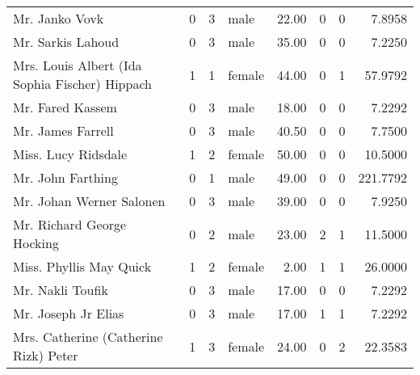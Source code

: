 \begin{tabular}{lrrlrrrr}
Mr. Janko Vovk                                     &         0 &       3 &    male &  22.00 &                        0 &                        0 &    7.8958 \\
Mr. Sarkis Lahoud                                  &         0 &       3 &    male &  35.00 &                        0 &                        0 &    7.2250 \\
Mrs. Louis Albert (Ida Sophia Fischer) Hippach     &         1 &       1 &  female &  44.00 &                        0 &                        1 &   57.9792 \\
Mr. Fared Kassem                                   &         0 &       3 &    male &  18.00 &                        0 &                        0 &    7.2292 \\
Mr. James Farrell                                  &         0 &       3 &    male &  40.50 &                        0 &                        0 &    7.7500 \\
Miss. Lucy Ridsdale                                &         1 &       2 &  female &  50.00 &                        0 &                        0 &   10.5000 \\
Mr. John Farthing                                  &         0 &       1 &    male &  49.00 &                        0 &                        0 &  221.7792 \\
Mr. Johan Werner Salonen                           &         0 &       3 &    male &  39.00 &                        0 &                        0 &    7.9250 \\
Mr. Richard George Hocking                         &         0 &       2 &    male &  23.00 &                        2 &                        1 &   11.5000 \\
Miss. Phyllis May Quick                            &         1 &       2 &  female &   2.00 &                        1 &                        1 &   26.0000 \\
Mr. Nakli Toufik                                   &         0 &       3 &    male &  17.00 &                        0 &                        0 &    7.2292 \\
Mr. Joseph Jr Elias                                &         0 &       3 &    male &  17.00 &                        1 &                        1 &    7.2292 \\
Mrs. Catherine (Catherine Rizk) Peter              &         1 &       3 &  female &  24.00 &                        0 &                        2 &   22.3583 \\

\end{tabular}
